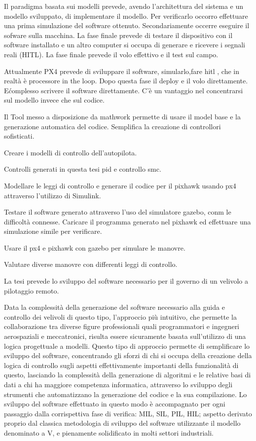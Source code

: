\begin{scaletta}
	Il paradigma basata sui modelli prevede, avendo l'architettura del sistema e un modello sviluppato, di implementare il modello. Per verificarlo occorro effettuare una prima simulazione del software ottenuto. Secondariamente occerre eseguire il sofware sulla macchina. La fase finale prevede di testare il dispositivo con il  software installato e un altro computer si occupa di generare e ricevere i segnali reali (HITL). La fase finale prevede il volo effettivo e il test sul campo.
	
	Attualmente PX4 prevede di sviluppare il software, simularlo,fare hitl , che in realtà è processore in the loop. Dopo questa fase il deploy e il volo direttamente. E\' complesso scrivere il software direttamente. C'è un vantaggio nel concentrarsi sul modello invece che sul codice.
			
	Il Tool messo a disposizione da mathwork permette di usare il model base e la generazione automatica del codice. Semplifica la creazione di controllori sofisticati.
	
	Creare i modelli di controllo dell'autopilota.

	Controlli generati in questa tesi pid e controllo smc.
	
	Modellare le leggi di controllo e generare il codice per il pixhawk usando px4 attraverso l'utilizzo di Simulink.
	
	Testare il software generato attraverso l'uso del simulatore gazebo, conm le difficoltà connesse. Caricare il programma generato nel pixhawk ed effettuare una simulazione simile per verificare.
	
	Usare il px4 e pixhawk con gazebo per simulare le manovre.
	
	Valutare diverse manovre con differenti leggi di controllo.
	
\end{scaletta}
La tesi prevede lo sviluppo del software necessario per il governo di un velivolo a pilotaggio remoto.

Data la complessità della generazione del software necessario alla guida e controllo dei velivoli di questo tipo, l'approccio più intuitivo, che permette la collaborazione tra diverse figure professionali quali programmatori e ingegneri aerospaziali e meccatronici, risulta essere sicuramente basata sull'utilizzo di una logica progettuale a modelli. Questo tipo di approccio permette di semplificare lo sviluppo del software, concentrando gli sforzi di chi si occupa della creazione della logica di controllo sugli aspetti effettivamente importanti della funzionalità di questo, lasciando la complessità della generazione di algoritmi e le relative basi di dati a chi ha maggiore competenza informatica, attraverso lo sviluppo degli strumenti che automatizzano la generazione del codice e la sua compilazione. 
Lo sviluppo del software effettuato in questo modo è accompagnato per ogni passaggio dalla corrispettiva fase di verifica: MIL, SIL, PIL, HIL; aspetto derivato proprio dal classica metodologia di sviluppo del software utilizzante il modello denominato a V, e pienamente solidificato in molti settori industriali.

